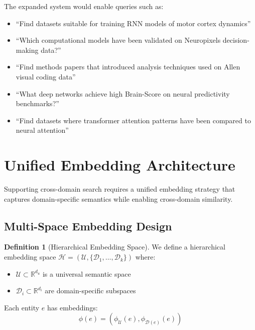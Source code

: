 \documentclass{article}
\theoremstyle{definition}
\newtheorem{definition}{Definition}[section]
\newcommand{\embed}{\phi}
\newcommand{\R}{\mathbb{R}}
\begin{document}
The expanded system would enable queries such as:

\begin{itemize}
    \item ``Find datasets suitable for training RNN models of motor cortex dynamics''
    \item ``Which computational models have been validated on Neuropixels decision-making data?''
    \item ``Find methods papers that introduced analysis techniques used on Allen visual coding data''
    \item ``What deep networks achieve high Brain-Score on neural predictivity benchmarks?''
    \item ``Find datasets where transformer attention patterns have been compared to neural attention''
\end{itemize}

\section{Unified Embedding Architecture}
\label{sec:embeddings}

Supporting cross-domain search requires a unified embedding strategy that captures domain-specific semantics while enabling cross-domain similarity.

\subsection{Multi-Space Embedding Design}

\begin{definition}[Hierarchical Embedding Space]
We define a hierarchical embedding space $\mathcal{H} = (\mathcal{U}, \{\mathcal{D}_1, \ldots, \mathcal{D}_k\})$ where:
\begin{itemize}
    \item $\mathcal{U} \subset \R^{d_u}$ is a universal semantic space
    \item $\mathcal{D}_i \subset \R^{d_i}$ are domain-specific subspaces
\end{itemize}
\end{definition}

Each entity $e$ has embeddings:
\begin{equation}
\embed(e) = (\embed_\mathcal{U}(e), \embed_{\mathcal{D}(e)}(e))
\end{equation}
\end{document}
